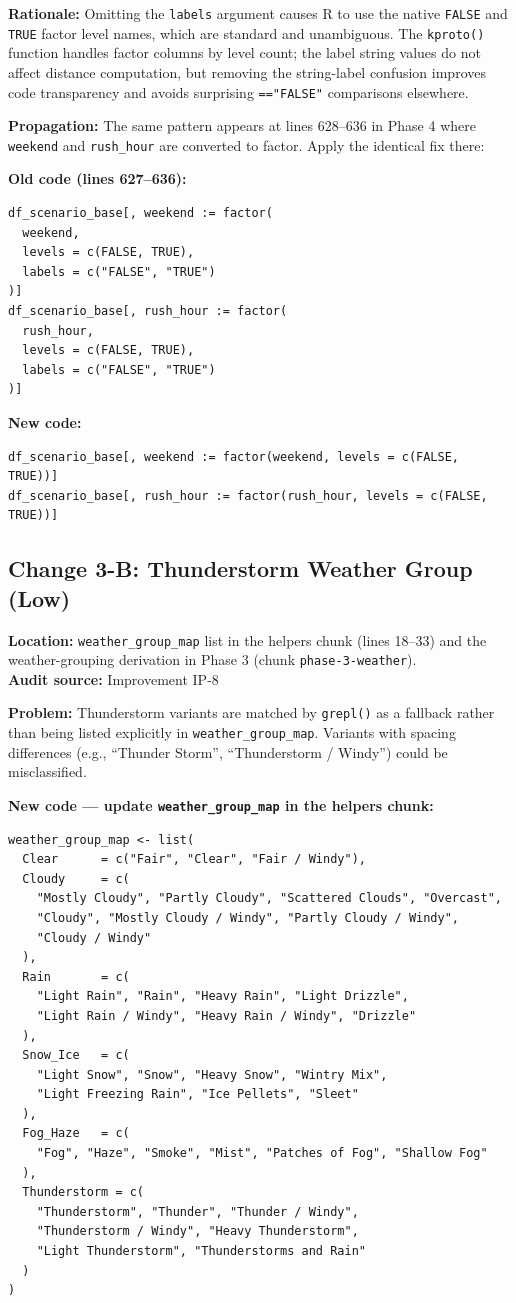 \documentclass[11pt]{article}
\newcommand{\rcode}[1]{\texttt{#1}}
\begin{document}
\textbf{Rationale:} Omitting the \rcode{labels} argument causes R to use
the native \rcode{FALSE} and \rcode{TRUE} factor level names, which are
standard and unambiguous. The \rcode{kproto()} function handles factor
columns by level count; the label string values do not affect distance
computation, but removing the string-label confusion improves code
transparency and avoids surprising \rcode{=="FALSE"} comparisons elsewhere.

\textbf{Propagation:} The same pattern appears at lines 628--636 in
Phase 4 where \rcode{weekend} and \rcode{rush\_hour} are converted to
factor. Apply the identical fix there:

\textbf{Old code (lines 627--636):}
\begin{lstlisting}
df_scenario_base[, weekend := factor(
  weekend,
  levels = c(FALSE, TRUE),
  labels = c("FALSE", "TRUE")
)]
df_scenario_base[, rush_hour := factor(
  rush_hour,
  levels = c(FALSE, TRUE),
  labels = c("FALSE", "TRUE")
)]
\end{lstlisting}

\textbf{New code:}
\begin{lstlisting}
df_scenario_base[, weekend := factor(weekend, levels = c(FALSE, TRUE))]
df_scenario_base[, rush_hour := factor(rush_hour, levels = c(FALSE, TRUE))]
\end{lstlisting}

\subsection{Change 3-B: Thunderstorm Weather Group (Low)}

\textbf{Location:} \rcode{weather\_group\_map} list in the helpers chunk (lines 18--33)
and the weather-grouping derivation in Phase 3 (chunk \rcode{phase-3-weather}).\\
\textbf{Audit source:} Improvement IP-8

\textbf{Problem:} Thunderstorm variants are matched by \rcode{grepl()} as a
fallback rather than being listed explicitly in \rcode{weather\_group\_map}.
Variants with spacing differences (e.g., ``Thunder Storm'', ``Thunderstorm / Windy'')
could be misclassified.

\textbf{New code --- update \rcode{weather\_group\_map} in the helpers chunk:}
\begin{lstlisting}
weather_group_map <- list(
  Clear      = c("Fair", "Clear", "Fair / Windy"),
  Cloudy     = c(
    "Mostly Cloudy", "Partly Cloudy", "Scattered Clouds", "Overcast",
    "Cloudy", "Mostly Cloudy / Windy", "Partly Cloudy / Windy",
    "Cloudy / Windy"
  ),
  Rain       = c(
    "Light Rain", "Rain", "Heavy Rain", "Light Drizzle",
    "Light Rain / Windy", "Heavy Rain / Windy", "Drizzle"
  ),
  Snow_Ice   = c(
    "Light Snow", "Snow", "Heavy Snow", "Wintry Mix",
    "Light Freezing Rain", "Ice Pellets", "Sleet"
  ),
  Fog_Haze   = c(
    "Fog", "Haze", "Smoke", "Mist", "Patches of Fog", "Shallow Fog"
  ),
  Thunderstorm = c(
    "Thunderstorm", "Thunder", "Thunder / Windy",
    "Thunderstorm / Windy", "Heavy Thunderstorm",
    "Light Thunderstorm", "Thunderstorms and Rain"
  )
)
\end{lstlisting}
\end{document}

